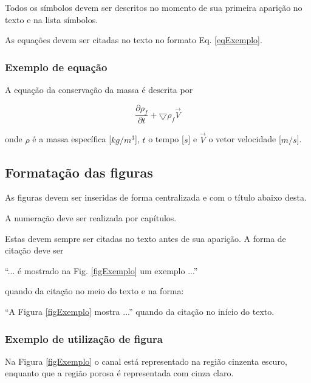\documentclass[a4paper,12pt,oneside]{article}
\numberwithin{equation}{section}
\begin{document}
Todos os símbolos devem ser descritos no momento de sua primeira aparição no texto e na lista símbolos.


As equações devem ser citadas no texto no formato Eq. \ref{eqExemplo}.


\subsubsection{Exemplo de equação}

A equação da conservação da massa é descrita por

\begin{equation}
\frac{\partial\rho_{f}}{\partial t} + \bigtriangledown \rho_{f} \vec{V}
\label{eqExemplo}
\end{equation}

onde $\rho$ é a massa específica [$kg/m^{3}$], $t$ o tempo [$s$] e  $\vec{V}$ o vetor velocidade [$m/s$].

\subsection{Formatação das figuras}

As figuras devem ser inseridas de forma centralizada e com o título abaixo desta.

A numeração deve ser realizada por capítulos.

Estas devem sempre ser citadas no texto antes de sua aparição. A forma de citação deve ser 


“... é mostrado na Fig. \ref{figExemplo} um exemplo ...” 

quando da citação no meio do texto e na forma:

 “A Figura \ref{figExemplo} mostra ...” quando da citação no início do texto.
 
 
\subsubsection{Exemplo de utilização de figura}

Na Figura \ref{figExemplo} o canal está representado na região cinzenta escuro, enquanto que a região
porosa é representada com cinza claro.
\end{document}
